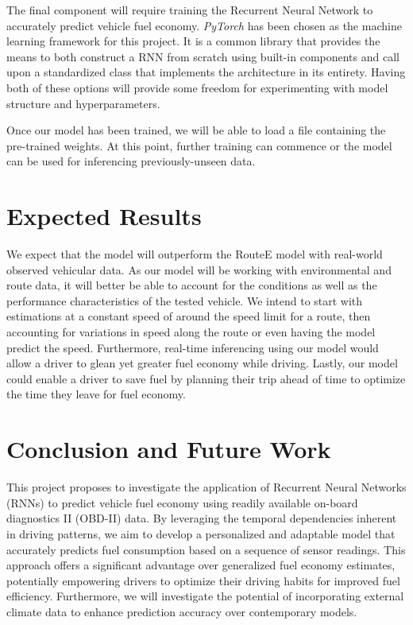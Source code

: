 \documentclass[letterpaper]{article}
\begin{document}
The final component will require training the Recurrent Neural Network to accurately predict vehicle fuel economy.
\emph{PyTorch} has been chosen as the machine learning framework for this project. It is a common library that
provides the means to both construct a RNN from scratch using built-in components and call upon a standardized class
that implements the architecture in its entirety. Having both of these options will provide some freedom for
experimenting with model structure and hyperparameters.

Once our model has been trained, we will be able to load a file containing the pre-trained weights. At this point,
further training can commence or the model can be used for inferencing previously-unseen data.

\section{Expected Results}

We expect that the model will outperform the RouteE model with real-world observed vehicular data. 
As our model will be working with environmental and route data, 
it will better be able to account for the conditions as well as the performance characteristics of the tested vehicle.
We intend to start with estimations at a constant speed of around the speed limit for a route, 
then accounting for variations in speed along the route or even having the model predict the speed.
Furthermore, real-time inferencing using our model would allow a driver to glean yet greater fuel economy while driving.
Lastly, our model could enable a driver to save fuel by planning their trip ahead of time to optimize the time they leave for fuel economy.

\section{Conclusion and Future Work}

This project proposes to investigate the application of Recurrent Neural Networks (RNNs) to predict vehicle fuel economy using readily available on-board diagnostics II (OBD-II) data. 
By leveraging the temporal dependencies inherent in driving patterns, 
we aim to develop a personalized and adaptable model that accurately predicts fuel consumption based on a sequence of sensor readings. 
This approach offers a significant advantage over generalized fuel economy estimates, 
potentially empowering drivers to optimize their driving habits for improved fuel efficiency. 
Furthermore, we will investigate the potential of incorporating external climate data to enhance prediction accuracy over contemporary models.
\end{document}

